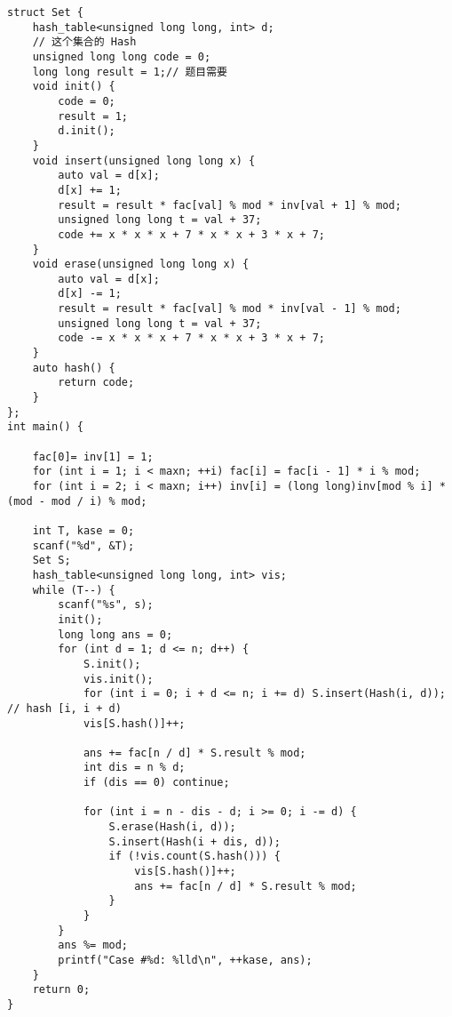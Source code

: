 \begin{verbatim}
struct Set {
    hash_table<unsigned long long, int> d;
    // 这个集合的 Hash
    unsigned long long code = 0;
    long long result = 1;// 题目需要
    void init() {
        code = 0;
        result = 1;
        d.init();
    }
    void insert(unsigned long long x) {
        auto val = d[x];
        d[x] += 1;
        result = result * fac[val] % mod * inv[val + 1] % mod; 
        unsigned long long t = val + 37;
        code += x * x * x + 7 * x * x + 3 * x + 7;
    }
    void erase(unsigned long long x) {
        auto val = d[x];
        d[x] -= 1;
        result = result * fac[val] % mod * inv[val - 1] % mod;
        unsigned long long t = val + 37;
        code -= x * x * x + 7 * x * x + 3 * x + 7;
    }
    auto hash() {
        return code;
    }
};
int main() {
    
    fac[0]= inv[1] = 1;
    for (int i = 1; i < maxn; ++i) fac[i] = fac[i - 1] * i % mod;
    for (int i = 2; i < maxn; i++) inv[i] = (long long)inv[mod % i] * (mod - mod / i) % mod;
    
    int T, kase = 0;
    scanf("%d", &T);
    Set S;
    hash_table<unsigned long long, int> vis;
    while (T--) {
        scanf("%s", s);
        init();
        long long ans = 0;
        for (int d = 1; d <= n; d++) {
            S.init();
            vis.init();
            for (int i = 0; i + d <= n; i += d) S.insert(Hash(i, d)); // hash [i, i + d)
            vis[S.hash()]++;
            
            ans += fac[n / d] * S.result % mod;
            int dis = n % d;
            if (dis == 0) continue;
            
            for (int i = n - dis - d; i >= 0; i -= d) {
                S.erase(Hash(i, d));
                S.insert(Hash(i + dis, d));
                if (!vis.count(S.hash())) {
                    vis[S.hash()]++;
                    ans += fac[n / d] * S.result % mod;
                }
            }
        }
        ans %= mod;
        printf("Case #%d: %lld\n", ++kase, ans);
    }
    return 0;
}
\end{verbatim}
